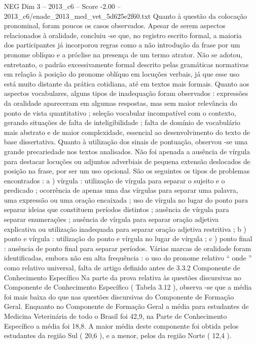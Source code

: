 \begin{textsample}{NEG Dim 3 – 2013\_c6 – Score -2.00 – 2013\_c6/enade\_2013\_med\_vet\_5d625e2f60.txt}
Quanto à questão da colocação pronominal, foram poucos os casos observados.
Apesar de serem aspectos relacionados à oralidade, concluiu -se que, no registro escrito formal, a maioria dos participantes já incorporou regras como a não introdução da frase por um pronome oblíquo e a próclise na presença de um termo atrator.
Não se adotou, entretanto, o padrão excessivamente formal descrito pelas gramáticas normativas em relação à posição do pronome oblíquo em locuções verbais, já que esse uso está muito distante da prática cotidiana, até em textos mais formais.
Quanto aos aspectos vocabulares, alguns tipos de inadequação foram observados : expressões da oralidade apareceram em algumas respostas, mas sem maior relevância do ponto de vista quantitativo ; seleção vocabular incompatível com o contexto, gerando situações de falta de inteligibilidade ; falta de domínio de vocabulário mais abstrato e de maior complexidade, essencial ao desenvolvimento do texto de base dissertativa.
Quanto à utilização dos sinais de pontuação, observou -se uma grande precariedade nos textos analisados.
Não foi apenada a ausência de vírgula para destacar locuções ou adjuntos adverbiais de pequena extensão deslocados de posição na frase, por ser um uso opcional.
São os seguintes os tipos de problemas encontrados : a ) vírgula : utilização de vírgula para separar o sujeito e o predicado ; ocorrência de apenas uma das vírgulas para separar uma palavra, uma expressão ou uma oração encaixada ; uso de vírgula no lugar do ponto para separar ideias que constituem períodos distintos ; ausência de vírgula para separar enumerações ; ausência de vírgula para separar oração adjetiva explicativa ou utilização inadequada para separar oração adjetiva restritiva ; b ) ponto e vírgula : utilização do ponto e vírgula no lugar de vírgula ; c ) ponto final : ausência de ponto final para separar períodos.
Várias marcas de oralidade foram identificadas, embora não em alta frequência : o uso do pronome relativo “ onde ” como relativo universal, falta de artigo definido antes de 3.3.2 Componente de Conhecimento Específico Na parte da prova relativa às questões discursivas no Componente de Conhecimento Específico ( Tabela 3.12 ), observa -se que a média foi mais baixa do que nas questões discursivas do Componente de Formação Geral.
Enquanto no Componente de Formação Geral a média para estudantes de Medicina Veterinária de todo o Brasil foi 42,9, na Parte de Conhecimento Específico a média foi 18,8.
A maior média deste componente foi obtida pelos estudantes da região Sul ( 20,6 ), e a menor, pelos da região Norte ( 12,4 ).

\end{textsample}

